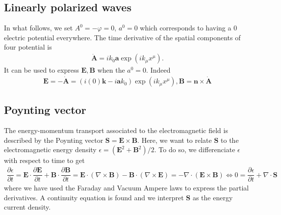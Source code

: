 \documentclass[10pt, a4paper]{article}
\begin{document}
{\subsection{Linearly polarized waves}

In what follows, we set $A^0 = -\varphi = 0$, $a^0 = 0$ which corresponds to having a $0$ electric potential everywhere. The time derivative of the spatial components of four potential is
\begin{align*} 
    \dot{\mathbf{A}} = i k_0 \mathbf{a} \exp \left(i k_\mu x^\mu\right).
\end{align*}
It can be used to express $\mathbf{E}, \mathbf{B}$ when the $a^0 = 0$. Indeed
\begin{align*}
    \mathbf{E} =  -\mathbf{\dot{A}} =  (i (0) \mathbf{k} - i\mathbf{a} k_0)  \exp \left(i k_\mu x^\mu\right), \mathbf{B} =  \mathbf{n} \times \dot{\mathbf{A}}
\end{align*}
\subsection{Poynting vector}
The energy-momentum transport associated to the electromagnetic field is described by the Poynting vector $\mathbf{S} = \mathbf{E} \times \mathbf{B}$. Here, we want to relate $\mathbf{S}$ to the electromagnetic energy density $\epsilon = (\mathbf{E}^2 +  \mathbf{B}^2)/2$. To do so, we differenciate $\epsilon$ with respect to time to get 
\begin{align*}
    \dfrac{\partial \epsilon}{\partial t} = \mathbf{E} \cdot \dfrac{\partial \mathbf{E}}{\partial t} + \mathbf{B} \cdot \dfrac{\partial \mathbf{B}}{\partial t} = \mathbf{E} \cdot \left(\nabla \times \mathbf{B}\right) - \mathbf{B} \cdot \left(\nabla \times \mathbf{E}\right) = - \nabla  \cdot \left(\mathbf{E} \times \mathbf{B}\right) \iff 0 = \dfrac{\partial \epsilon}{\partial t} + \nabla  \cdot \mathbf{S}
\end{align*}
where we have used the Faraday and Vacuum Ampere laws to express the partial derivatives. A continuity equation is found and we interpret $\mathbf{S}$ as the energy current density. 

}
\end{document}
